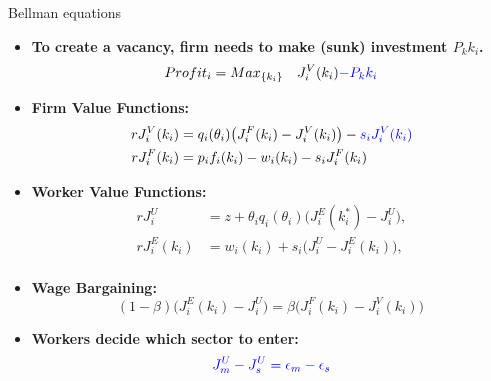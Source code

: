 \documentclass[9pt,xcolor={svgnames}]{beamer}
\begin{document}
\begin{frame}{Bellman equations}




\vspace{1em}
  \begin{itemize}


   \item \textbf{To create a vacancy, firm needs to make (sunk) investment $P_k k_i$. }
\[
 Profit_i= Max_{\{k_i\}}  \quad J^V_i(k_i)  \textcolor{blue}{- P_kk_i}
\]

  
  \item \textbf{Firm Value Functions:}
     \[
      \begin{aligned}
           rJ_i^V(k_i) &=  q_i(\theta_i)\big(J_i^F(k_i)-J_i^V(k_i)\big) - \textcolor{blue}{s_i J^V_i(k_i)} \\
             rJ_i^F(k_i) &= p_i f_i(k_i) - w_i(k_i) - s_i J_i^F(k_i)
      \end{aligned}
\]
  
    \item \textbf{Worker Value Functions:}
      \[
      \begin{aligned}
        rJ_i^U &= z+ \theta_i q_i(\theta_i)\big(J_i^E(k^*_i)-J_i^U\big),\\
        rJ_i^E(k_i) &= w_i(k_i) + s_i\big(J_i^U-J_i^E(k_i)\big), \\
      \end{aligned}
      \]
  
      
      
    \item \textbf{Wage Bargaining:}
      \[
        (1-\beta)\bigl(J^E_i(k_i) - J^U_i\bigr)
        = \beta\bigl(J^F_i(k_i) - J^V_i(k_i)\bigr)\
      \]

    \item \textbf{Workers decide which sector to enter:}
\[
 \textcolor{blue}{  J^U_m  - J^U_s  = \epsilon_m - \epsilon_s}
\]


      
  \end{itemize}
\end{frame}
\end{document}
